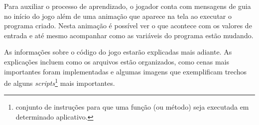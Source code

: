 Para auxiliar o processo de aprendizado, o jogador conta com mensagens de guia no 
início do jogo além de uma animação que aparece na tela ao executar o programa 
criado. Nesta animação é possível ver o que acontece com os valores de entrada 
e até mesmo acompanhar como as variáveis do programa estão mudando.

As informações sobre o código do jogo estarão explicadas mais adiante. As 
explicações incluem como os arquivos estão organizados, como cenas mais 
importantes foram implementadas e algumas imagens que exemplificam trechos de 
alguns \textit{scripts}\footnote{conjunto de instruções para que uma função 
(ou método) seja executada em determinado aplicativo.} mais importantes.
